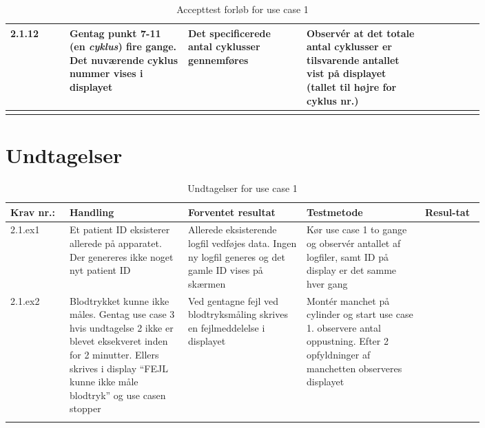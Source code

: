 \begin{longtable}{|p{0.1\linewidth}|p{0.2\linewidth}|p{0.2\linewidth}|p{0.2\linewidth}|p{0.1\linewidth}|}
			2.1.12& Gentag punkt 7-11 (en \textit{cyklus}) fire gange. Det nuværende cyklus nummer vises i displayet & Det specificerede antal cyklusser gennemføres & Observér at det totale antal cyklusser er tilsvarende antallet vist på displayet (tallet til højre for cyklus nr.) &  \\ \hline 
			\caption{Accepttest forløb for use case 1}
		\end{longtable}

		\section*{Undtagelser}
			\begin{longtable}{|p{0.1\linewidth}|p{0.2\linewidth}|p{0.2\linewidth}|p{0.2\linewidth}|p{0.1\linewidth}|}
				\hline
									\rowcolor{usDef}
				Krav nr.: & Handling & Forventet resultat & Testmetode & Resul-tat  \\\hline
				2.1.ex1 & Et patient ID eksisterer allerede på apparatet. Der genereres ikke noget nyt patient ID & Allerede eksisterende logfil vedføjes data. Ingen ny logfil generes og det gamle ID vises på skærmen & Kør use case 1 to gange og observér antallet af logfiler, samt ID på display er det samme hver gang &  \\
				\hline
				2.1.ex2 & Blodtrykket kunne ikke måles. Gentag use case 3 hvis undtagelse 2 ikke er blevet eksekveret inden for 2 minutter. Ellers skrives i display “FEJL kunne ikke måle blodtryk” og use casen stopper  & Ved gentagne fejl ved blodtryksmåling skrives en fejlmeddelelse i displayet & Montér manchet på cylinder og start use case 1. observere antal oppustning. Efter 2 opfyldninger af manchetten observeres displayet & \\ \hline
				\caption{Undtagelser for use case 1}
			\end{longtable}